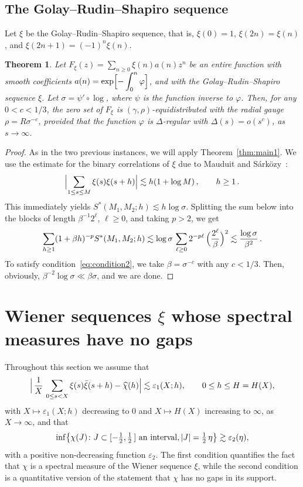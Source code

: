 \documentclass[11pt]{amsart}
\numberwithin{equation}{section}
\newtheorem{theorem}{Theorem}
\def\ep{{\varepsilon}}
\begin{document}
\subsection{The Golay--Rudin--Shapiro sequence}

Let $\xi$ be the Golay--Rudin--Shapiro sequence, that is,
$\xi (0)=1$, $\xi(2n)=\xi(n)$, and $\xi(2n+1)=(-1)^n\xi (n)$.

\begin{theorem}\label{thm:GRS-sequences}
Let $F_\xi (z) = \sum_{n\ge 0} \xi(n) a(n) z^n $ be an entire function with smooth
coefficients $a(n) = \exp\Bigl[ -\displaystyle \int_0^n \varphi \Bigr]$, and
with the Golay--Rudin--Shapiro sequence $\xi$. Let $\sigma=\psi'\circ\log$,
where $\psi$ is the function inverse to $\varphi$.
Then, for any $0<c<1/3$, the zero set of $F_\xi$ is $(\gamma, \rho)$-equidistributed with the radial gauge $\rho=R\sigma^{-c}$, provided that the function $\varphi$ is $\Delta$-regular
with $\Delta (s) = o(s^c)$, as $s\to\infty$.
\end{theorem}

\begin{proof}
As in the two previous instances, we will apply Theorem~\ref{thm:main1}.
We use the estimate for the binary correlations of $\xi$ due to Mauduit and
S\'ark\"ozy~\cite[Theorem~4]{MaSa}:
\[
\Bigl| \sum_{1\le s \le M} \xi(s)\xi(s+h) \Bigr| \lesssim h(1+\log M)\,,
\qquad h\ge 1\,.
\]
This immediately yields $ S^*(M_1, M_2; h) \lesssim h\log\sigma $.
Splitting the sum below into the blocks of length $\beta^{-1}2^\ell$, $\ell\ge 0$,
and taking $p>2$, we get
\[
\sum_{h\ge 1} (1+\beta h)^{-p} S^*(M_1, M_2; h)
\lesssim \log\sigma\, \sum_{\ell \ge 0} 2^{-p\ell}\, \Bigl( \frac{2^\ell}\beta \Bigr)^2
\lesssim \frac{\log\sigma}{\beta^2}\,.
\]
To satisfy condition~\eqref{eq:condition2}, we take $\beta=\sigma^{-c}$
with any $c<1/3$. Then, obviously, $\beta^{-2}\log\sigma \ll \beta\sigma$, and we are done.
\end{proof}

\section{Wiener sequences $\xi$ whose spectral measures have no gaps}
\label{sect:8}

Throughout this section we assume that
\begin{equation}\label{eq:C1}
\Bigl|\, \frac1X\, \sum_{0\le s < X} \xi(s)\bar\xi(s+h) - \widehat{\chi}(h) \Bigr|
\lesssim \ep_1(X; h), \qquad 0\le h \le H=H(X),
\end{equation}
with $X\mapsto \ep_1(X; h)$ decreasing to $0$ and $X\mapsto H(X)$ increasing to $\infty$,
as $X\to\infty$, and that
\begin{equation}\label{eq:C2}
\inf\bigl\{\chi(J)\colon
J\subset [-\tfrac12, \tfrac12\,] {\rm\ an\ interval}, |J|=\tfrac12\, \eta\bigr\}
\gtrsim \ep_2(\eta),
\end{equation}
with a positive non-decreasing function $\ep_2$.
The first condition quantifies the fact that $\chi$ is a spectral measure
of the Wiener sequence $\xi$, while the second condition is a quantitative version
of the statement that $\chi$ has no gaps in its support.
\end{document}
